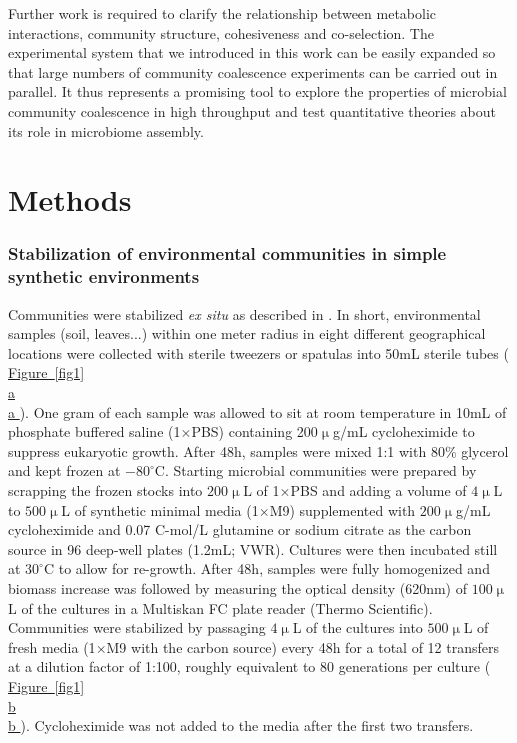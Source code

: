 \documentclass[a4paper,10pt]{article}
\newcommand{\figref}[2][]{%
  \hyperref[{#2}]{%
    Figure~\ref*{#2}%
    \ifx\\#1\\%
    \else
      #1%
    \fi
  }%
}
\begin{document}
Further work is required to clarify the relationship between metabolic interactions,
community structure, cohesiveness and co-selection.
The experimental system that we introduced in this work can be easily expanded so that
large numbers of community coalescence experiments can be carried out in parallel.
It thus represents a promising tool to explore the properties of microbial community
coalescence in high throughput
and test quantitative theories about its role in microbiome assembly.

\clearpage











\section*{Methods}\label{methods}

\subsubsection*{Stabilization of environmental communities in simple synthetic environments}
\label{methods:community-assembly}

Communities were stabilized \textit{ex situ} as described in \cite{Goldford2018}.
In short, environmental samples (soil, leaves...) within one meter radius in eight different
geographical locations were collected with sterile
tweezers or spatulas into 50mL sterile tubes (\figref[a]{fig1}).
One gram of each sample was allowed to
sit at room temperature in 10mL of phosphate buffered saline (1$\times$PBS) containing
200$\upmu$g/mL cycloheximide to suppress eukaryotic growth.
After 48h, samples were mixed 1:1 with 80\% glycerol and kept frozen at $-80^\circ$C.
Starting microbial communities were prepared by scrapping the frozen stocks into
$200\upmu$L of 1$\times$PBS and adding a volume of $4\upmu$L to $500\upmu$L
of synthetic minimal media (1$\times$M9) supplemented with $200\upmu$g/mL cycloheximide
and 0.07 C-mol/L glutamine or sodium citrate as the carbon source in 96 deep-well plates
(1.2mL; VWR).
Cultures were then incubated still at $30^\circ$C to allow for re-growth.
After 48h, samples were fully homogenized and biomass increase was followed by measuring
the optical density (620nm) of $100\upmu$L of the cultures in a Multiskan FC plate reader
(Thermo Scientific).
Communities were stabilized \cite{Goldford2018} by passaging $4\upmu$L of the cultures into
$500\upmu$L of fresh media (1$\times$M9 with the carbon source)  every 48h for a total of
12 transfers at a dilution factor of 1:100,
roughly equivalent to 80 generations per culture (\figref[b]{fig1}).
Cycloheximide was not added to the media after the first two transfers.
\end{document}
